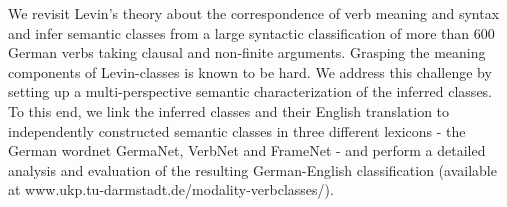 We revisit Levin's theory about the correspondence of verb meaning and syntax and infer semantic classes from  a large syntactic classification of more than 600 German verbs taking clausal and non-finite arguments. Grasping the  meaning components of Levin-classes is known to be hard. We address this challenge by setting up a multi-perspective semantic characterization of  the inferred classes. To this end, we link the inferred classes and their English translation to independently constructed semantic classes in three different lexicons - the German wordnet GermaNet, VerbNet and FrameNet - and perform a detailed analysis and evaluation of the resulting German-English classification (available at www.ukp.tu-darmstadt.de/modality-verbclasses/).
